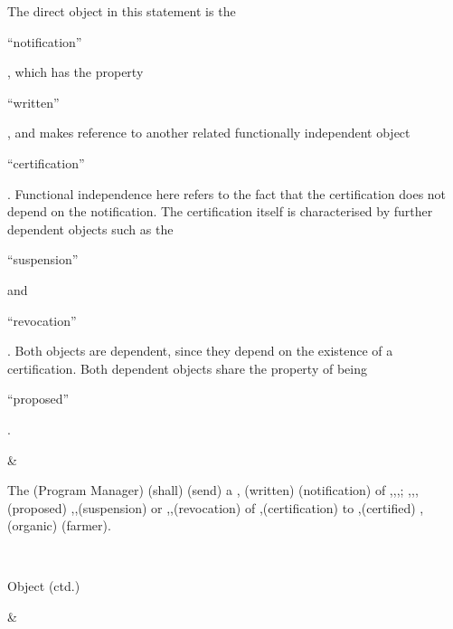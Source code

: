 \begin{landscape}
\begin{longtable}{\tabledims}
\sp

The direct object in this statement is the \begin{exi}``notification''\end{exi}, which has the property \begin{exi}``written''\end{exi}, and makes reference to another related functionally independent object \begin{exi}``certification''\end{exi}. Functional independence here refers to the fact that the certification does not depend on the notification. The certification itself is characterised by further dependent objects such as the \begin{exi}``suspension''\end{exi} and \begin{exi}``revocation''\end{exi}. Both objects are dependent, since they depend on the existence of a certification. Both dependent objects share the property of being \begin{exi}``proposed''\end{exi}.


&

\vspace{0.04cm}

\begin{exi}The \A{}(Program Manager) \D{}(shall) \I{}(send) a \Bdir{}, \propExt{}(written) \Bdir{}(notification) of \Bdir{},,,\propExt{}; \Bdir{},,,\propExt{}(proposed) \Bdir{},,(suspension) or \Bdir{},,(revocation) of \Bdir{},(certification) to \Bind{},(certified) \Bind{},(organic) \Bind{}(farmer).\end{exi}

\\

\begin{emp}Object (ctd.)\end{emp}

& 


\end{longtable}
\end{landscape}
